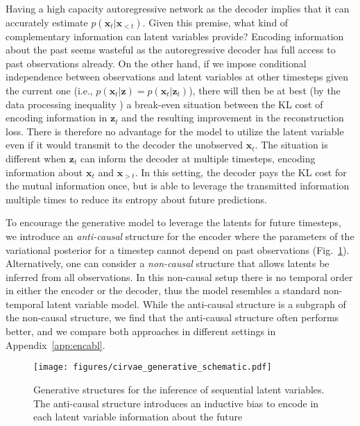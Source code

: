 \documentclass{article} \usepackage{iclr2019_conference,times}
\def\figref#1{figure~\ref{#1}}
\def\rvx{{\mathbf{x}}}
\def\rvz{{\mathbf{z}}}
\renewcommand{\figref}[1]{Fig.~\ref{#1}}
\newcommand{\aref}[1]{Appendix~\ref{#1}}
\begin{document}
 Having a high capacity autoregressive network as the decoder implies that it can accurately estimate $p(\rvx_t|\rvx_{<t})$.
Given this premise, what kind of complementary information can latent variables provide? Encoding information about the past seems wasteful as the autoregressive decoder has full access to past observations already. On the other hand, if we impose conditional independence between observations and latent variables at other timesteps given the current one (i.e., $p(\rvx_t|\rvz) = p(\rvx_t|\rvz_t)$), there will then be at best (by the data processing inequality \citep{ThomasCover}) a break-even situation between the KL cost of encoding information in $\rvz_t$ and the resulting improvement in the reconstruction loss. There is therefore no advantage for the model to utilize the latent variable even if it would transmit to the decoder the unobserved $\rvx_t$. The situation is different when $\rvz_t$ can inform the decoder at multiple timesteps, encoding information about $\rvx_t$ and $\rvx_{>t}$. In this setting, the decoder pays the KL cost for the mutual information once, but is able to leverage the transmitted information multiple times to reduce its entropy about future predictions. 


\par
To encourage the generative model to leverage the latents for future timesteps, we introduce an \emph{anti-causal} structure for the encoder where the parameters of the variational posterior for a timestep cannot depend on past observations (\figref{fig:gengraph}).
Alternatively, one can consider a \emph{non-causal} structure that allows latents be inferred from all observations. 
In this non-causal setup there is no temporal order in either the encoder or the decoder, thus the model resembles a standard non-temporal latent variable model. While the anti-causal structure is
a subgraph of the non-causal structure, we find that the anti-causal structure often performs better, and we compare both approaches in different settings in \aref{app:encabl}. 

\par

\begin{figure}[th!]
    \centering

    \texttt{[image: figures/cirvae\_generative\_schematic.pdf]}
   
    \caption{Generative structures for the inference of sequential latent variables. The anti-causal structure introduces an inductive bias to encode
    in each latent variable information about the future}
    \label{fig:gengraph}
\end{figure}
\end{document}
